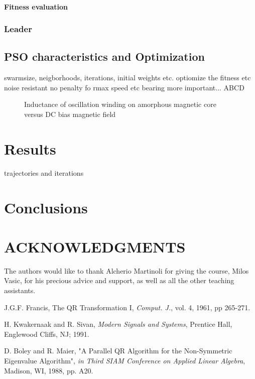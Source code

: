 \documentclass[a4, 10 pt, conference]{ieeeconf}  %
\begin{document}
\paragraph{Fitness evaluation}

\subsubsection{Leader}

\subsection{PSO characteristics and Optimization}
swarmsize, neigborhoods, iterations, initial weights etc.
optiomize the fitness etc noise resistant
no penalty fo rmax speed etc
bearing more important... ABCD




   \begin{figure}[thpb]
      \centering
      \caption{Inductance of oscillation winding on amorphous
       magnetic core versus DC bias magnetic field}
      \label{figurelabel}
   \end{figure}

\section{Results}
trajectories and iterations
\section{Conclusions}

\section{ACKNOWLEDGMENTS}
The authors would like to thank Alcherio Martinoli for giving the course, Milos Vasic, for his precious advice and support, as well as all the other teaching assistants.

\begin{thebibliography}{99}

J.G.F. Francis, The QR Transformation I, {\it Comput. J.}, vol. 4, 1961, pp 265-271.

H. Kwakernaak and R. Sivan, {\it Modern Signals and Systems}, Prentice Hall, Englewood Cliffs, NJ; 1991.

D. Boley and R. Maier, "A Parallel QR Algorithm for the Non-Symmetric Eigenvalue Algorithm", {\it in Third SIAM Conference on Applied Linear Algebra}, Madison, WI, 1988, pp. A20.

\end{thebibliography}
\end{document}
